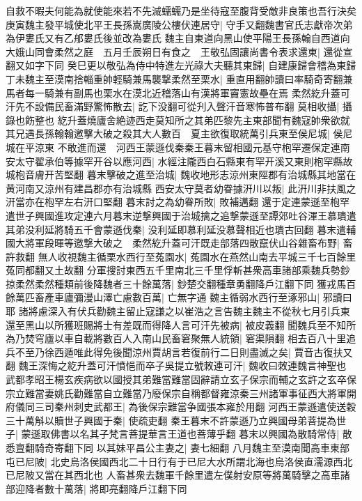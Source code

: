 自救不暇夫何能為就使能來若不先滅蠕蠕乃是坐待寇至腹背受敵非良策也吾行決矣庚寅魏主發平城使北平王長孫嵩廣陵公樓伏連居守|{
	守手又翻魏書官氏志獻帝次弟為伊婁氏又有乙郍婁氏後並改為婁氏}
魏主自東道向黑山使平陽王長孫翰自西道向大娥山同會柔然之庭　五月壬辰朔日有食之　王敬弘固讓尚書令表求還東|{
	還從宣翻又如字下同}
癸巳更以敬弘為侍中特進左光祿大夫聽其東歸|{
	自建康歸會稽為東歸}
丁未魏主至漠南捨輜重帥輕騎兼馬襲撃柔然至栗水|{
	重直用翻帥讀曰率騎奇寄翻兼馬者每一騎兼有副馬也栗水在漠北近稽落山有漢將軍竇憲故壘在焉}
柔然紇升蓋可汗先不設備民畜滿野驚怖散去|{
	訖下没翻可從刋入聲汗音寒怖普布翻}
莫相收攝|{
	攝錄也飭整也}
紇升蓋燒廬舍絶迹西走莫知所之其弟匹黎先主東部聞有魏寇帥衆欲就其兄遇長孫翰翰邀擊大破之殺其大人數百　夏主欲復取統萬引兵東至侯尼城|{
	侯尼城在平涼東}
不敢進而還　河西王蒙遜伐秦秦王暮末留相國元基守枹罕遷保定連南安太守翟承伯等據罕开谷以應河西|{
	水經注隴西白石縣東有罕开溪又東則枹罕縣故城枹音膚开苦堅翻}
暮末擊破之進至治城|{
	魏收地形志涼州東陘郡有治城縣其地當在黄河南又涼州有建昌郡亦有治城縣}
西安太守莫者幼眷據汧川以叛|{
	此汧川非扶風之汧當亦在枹罕左右汧口堅翻}
暮末討之為幼眷所敗|{
	敗補邁翻}
還于定連蒙遜至枹罕遣世子興國進攻定連六月暮末逆撃興國于治城擒之追撃蒙遜至譚郊吐谷渾王慕璝遣其弟没利延將騎五千會蒙遜伐秦|{
	没利延即慕利延没慕聲相近也璝古回翻}
暮末遣輔國大將軍段暉等邀撃大破之　柔然紇升蓋可汗既走部落四散竄伏山谷雜畜布野|{
	畜許救翻}
無人收視魏主循栗水西行至菟園水|{
	菟園水在燕然山南去平城三千七百餘里菟同都翻又土故翻}
分軍搜討東西五千里南北三千里俘斬甚衆高車諸部乘魏兵勢鈔掠柔然柔然種類前後降魏者三十餘萬落|{
	鈔楚交翻種章勇翻降戶江翻下同}
獲戎馬百餘萬匹畜產車廬彌漫山澤亡慮數百萬|{
	亡無字通}
魏主循弱水西行至涿邪山|{
	邪讀曰耶}
諸將慮深入有伏兵勸魏主留止寇謙之以崔浩之言告魏主魏主不從秋七月引兵東還至黑山以所獲班賜將士有差既而得降人言可汗先被病|{
	被皮義翻}
聞魏兵至不知所為乃焚穹廬以車自載將數百人入南山民畜窘聚無人統領|{
	窘渠隕翻}
相去百八十里追兵不至乃徐西遁唯此得免後聞涼州賈胡言若復前行二日則盡滅之矣|{
	賈音古復扶又翻}
魏王深悔之紇升蓋可汗憤悒而卒子吳提立號敇連可汗|{
	魏收曰敇連魏言神聖也}
武都孝昭王楊玄疾病欲以國授其弟難當難當固辭請立玄子保宗而輔之玄許之玄卒保宗立難當妻姚氏勸難當自立難當乃廢保宗自稱都督雍涼秦三州諸軍事征西大將軍開府儀同三司秦州刺史武都王|{
	為後保宗難當争國張本雍於用翻}
河西王蒙遜遣使送穀三十萬斛以贖世子興國于秦|{
	使疏吏翻}
秦王暮末不許蒙遜乃立興國母弟菩提為世子|{
	蒙遜取佛書以名其子梵言菩提華言王道也菩薄乎翻}
暮末以興國為散騎常侍|{
	散悉亶翻騎奇寄翻下同}
以其妹平昌公主妻之|{
	妻七細翻}
八月魏主至漠南聞高車東部屯已尼陂|{
	北史烏洛侯國西北二十日行有于已尼大水所謂北海也烏洛侯直濡源西北已尼陂又當在其西北也}
人畜甚衆去魏軍千餘里遣左僕射安原等將萬騎擊之高車諸部迎降者數十萬落|{
	將即亮翻降戶江翻下同}
